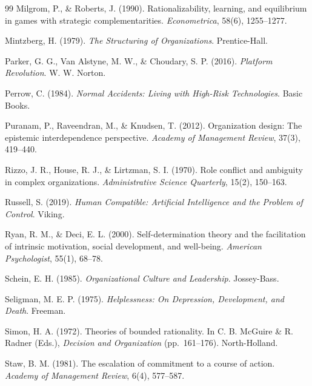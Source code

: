 \documentclass[12pt]{article}
\begin{document}
\begin{thebibliography}{99}
Milgrom, P., \& Roberts, J. (1990).
Rationalizability, learning, and equilibrium in games with strategic
complementarities.
\textit{Econometrica}, 58(6), 1255--1277.

Mintzberg, H. (1979).
\textit{The Structuring of Organizations}.
Prentice-Hall.

Parker, G. G., Van Alstyne, M. W., \& Choudary, S. P. (2016).
\textit{Platform Revolution}.
W. W. Norton.

Perrow, C. (1984).
\textit{Normal Accidents: Living with High-Risk Technologies}.
Basic Books.

Puranam, P., Raveendran, M., \& Knudsen, T. (2012).
Organization design: The epistemic interdependence perspective.
\textit{Academy of Management Review}, 37(3), 419--440.

Rizzo, J. R., House, R. J., \& Lirtzman, S. I. (1970).
Role conflict and ambiguity in complex organizations.
\textit{Administrative Science Quarterly}, 15(2), 150--163.

Russell, S. (2019).
\textit{Human Compatible: Artificial Intelligence and the Problem of Control}.
Viking.

Ryan, R. M., \& Deci, E. L. (2000).
Self-determination theory and the facilitation of intrinsic motivation,
social development, and well-being.
\textit{American Psychologist}, 55(1), 68--78.

Schein, E. H. (1985).
\textit{Organizational Culture and Leadership}.
Jossey-Bass.

Seligman, M. E. P. (1975).
\textit{Helplessness: On Depression, Development, and Death}.
Freeman.

Simon, H. A. (1972).
Theories of bounded rationality.
In C. B. McGuire \& R. Radner (Eds.),
\textit{Decision and Organization} (pp.\ 161--176).
North-Holland.

Staw, B. M. (1981).
The escalation of commitment to a course of action.
\textit{Academy of Management Review}, 6(4), 577--587.


\end{thebibliography}
\end{document}
